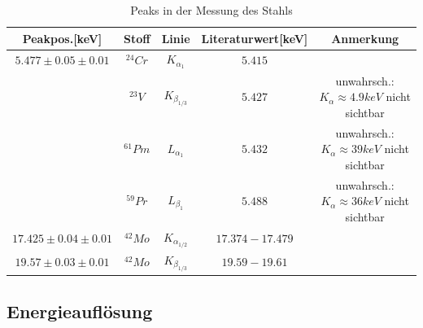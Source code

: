 \documentclass[12pt,a4paper]{article}
\begin{document}
\begin{table}
\center
\begin{tabular}{|c|c|c|c|c|}
\hline 
Peakpos.[keV] & Stoff & Linie & Literaturwert[keV] & Anmerkung \\
\hline 
$5.477\pm 0.05\pm 0.01$& $^{24}Cr$ & $K_{\alpha_{1}}$ & $5.415$ & \\ 
& $^{23}V$ & $K_{\beta_{1/3}}$ & $5.427$ & unwahrsch.: $K_{\alpha}\approx 4.9keV$ nicht sichtbar\\ 
& $^{61}Pm$ & $L_{\alpha_{1}}$ & $5.432$ & unwahrsch.: $K_{\alpha}\approx 39keV$ nicht sichtbar\\ 
& $^{59}Pr$ & $L_{\beta_{1}}$ & $5.488$ & unwahrsch.: $K_{\alpha}\approx 36keV$ nicht sichtbar\\ 
\hline 
$17.425\pm 0.04\pm 0.01$ & $^{42}Mo$ & $K_{\alpha_{1/2}}$ & $17.374-17.479$ & \\ 
\hline 
$19.57\pm 0.03\pm 0.01$ & $^{42}Mo$ & $K_{\beta_{1/3}}$ & $19.59-19.61$ & \\
 \hline 
\end{tabular} 
\caption{Peaks in der Messung des Stahls}
\label{tab:a_peaks_stahl}
\end{table}
\subsection{Energieauflösung}
\end{document}
